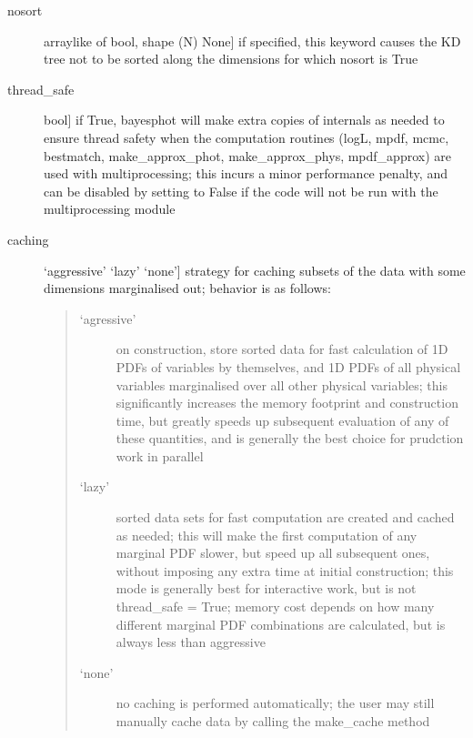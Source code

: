 \documentclass[letterpaper,10pt,english]{sphinxmanual}
\begin{document}
\begin{fulllineitems}
\begin{fulllineitems}
\begin{description}
\begin{description}
\item[{nosort}] \leavevmode{[}arraylike of bool, shape (N) \textbar{} None{]}
if specified, this keyword causes the KD tree not to be
sorted along the dimensions for which nosort is True

\item[{thread\_safe}] \leavevmode{[}bool{]}
if True, bayesphot will make extra copies of internals
as needed to ensure thread safety when the computation
routines (logL, mpdf, mcmc, bestmatch, make\_approx\_phot,
make\_approx\_phys, mpdf\_approx) are used with
multiprocessing; this incurs a minor performance
penalty, and can be disabled by setting to False if the
code will not be run with the multiprocessing module

\item[{caching}] \leavevmode{[}‘aggressive’ \textbar{} ‘lazy’ \textbar{} ‘none’{]}
strategy for caching subsets of the data with some
dimensions marginalised out; behavior is as follows:
\begin{quote}
\begin{description}
\item[{‘agressive’}] \leavevmode
on construction, store sorted data for fast
calculation of 1D PDFs of variables by themselves,
and 1D PDFs of all physical variables marginalised
over all other physical variables; this
significantly increases the memory footprint and
construction time, but greatly speeds up
subsequent evaluation of any of these quantities,
and is generally the best choice for prudction
work in parallel

\item[{‘lazy’}] \leavevmode
sorted data sets for fast computation are created
and cached as needed; this will make the first
computation of any marginal PDF slower, but speed
up all subsequent ones, without imposing any
extra time at initial construction; this mode is
generally best for interactive work, but is not
thread\_safe = True; memory cost depends on how
many different marginal PDF combinations are
calculated, but is always less than aggressive

\item[{‘none’}] \leavevmode
no caching is performed automatically; the user
may still manually cache data by calling
the make\_cache method

\end{description}
\end{quote}

\end{description}


\end{description}
\end{fulllineitems}
\end{fulllineitems}
\end{document}
